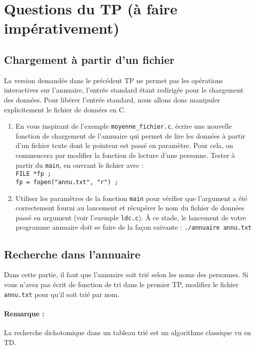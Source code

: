 \documentclass[final, a4paper, openbib, ]{article}
\begin{document}
\section{Questions du TP \large (à faire impérativement)}

\subsection{Chargement à partir d'un fichier}

La version demandée dans le précédent TP ne permet pas les opérations interactives sur l'annuaire, l'entrée standard étant redirigée pour le chargement des données. Pour libérer l'entrée standard, nous allons donc manipuler explicitement le fichier de données en C.

\begin{enumerate}
	\item  En vous inspirant de l'exemple \texttt{moyenne\_fichier.c}, écrire une nouvelle fonction de chargement de l'annuaire qui permet de lire les données à partir d'un fichier texte dont le pointeur est passé en paramètre. Pour cela, on commencera par modifier la
	fonction de lecture d'une personne. Tester à partir du \texttt{main}, en ouvrant le fichier
	avec : \\
	\texttt{FILE *fp ;}\\
	\texttt{fp = fopen("annu.txt", "r") ;}
	
	\item Utiliser les paramètres de la fonction \texttt{main} pour vérifier que l'argument a été correctement fourni au lancement et récupérer le nom du fichier de données passé en argument (voir l'exemple \texttt{ldc.c}). À ce stade, le lancement de votre programme annuaire doit se faire de la façon suivante : \texttt{./annuaire annu.txt}	
\end{enumerate}


\subsection{Recherche dans l'annuaire}
Dans cette partie, il faut que l'annuaire soit trié selon les noms des personnes. Si vous
n'avez pas écrit de fonction de tri dans le premier TP, modifiez le fichier \texttt{annu.txt} pour qu'il soit trié par nom.
\paragraph{Remarque :} La recherche dichotomique dans un tableau trié est un algorithme classique vu en TD.
\end{document}
